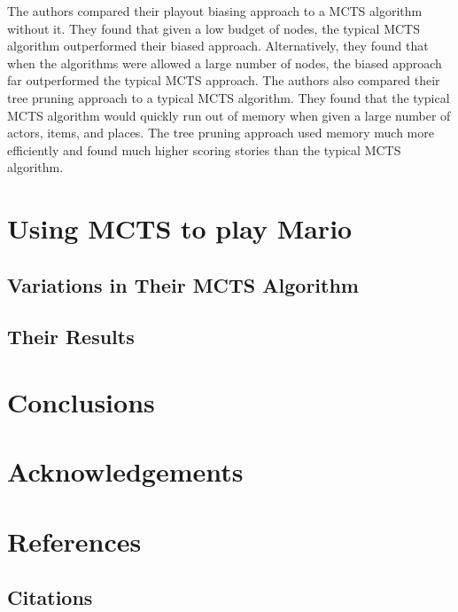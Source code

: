 \documentclass{sig-alternate}
\begin{document}
The authors compared their playout biasing approach to a MCTS algorithm without it. They found that given a low budget of nodes, the typical MCTS algorithm outperformed their biased approach. Alternatively, they found that when the algorithms were allowed a large number of nodes, the biased approach far outperformed the typical MCTS approach. The authors also compared their tree pruning approach to a typical MCTS algorithm. They found that the typical MCTS algorithm would quickly run out of memory when given a large number of actors, items, and places. The tree pruning approach used memory much more efficiently and found much higher scoring stories than the typical MCTS algorithm.

\section{Using MCTS to play Mario}

\subsection{Variations in Their MCTS Algorithm}

\subsection{Their Results}

\section{Conclusions}

\section{Acknowledgements}

\section{References}

\subsection{Citations}


  
\end{document}
